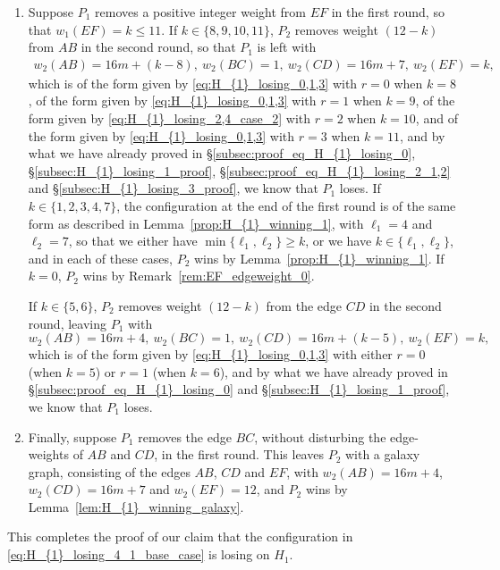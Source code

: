 \documentclass[11pt,reqno]{amsart}
\theoremstyle{definition}
\theoremstyle{definition}
\begin{document}
\begin{enumerate}
\item Suppose $P_{1}$ removes a positive integer weight from $EF$ in the first round, so that $w_{1}(EF)=k\leqslant 11$. If $k \in \{8,9,10,11\}$, $P_{2}$ removes weight $(12-k)$ from $AB$ in the second round, so that $P_{1}$ is left with
\begin{align}
w_{2}(AB)=16m+(k-8),\ w_{2}(BC)=1,\ w_{2}(CD)=16m+7,\ w_{2}(EF)=k,\nonumber
\end{align}
which is of the form given by \eqref{eq:H_{1}_losing_0,1,3} with $r=0$ when $k=8$, of the form given by \eqref{eq:H_{1}_losing_0,1,3} with $r=1$ when $k=9$, of the form given by \eqref{eq:H_{1}_losing_2,4_case_2} with $r=2$ when $k=10$, and of the form given by \eqref{eq:H_{1}_losing_0,1,3} with $r=3$ when $k=11$, and by what we have already proved in \S\ref{subsec:proof_eq_H_{1}_losing_0}, \S\ref{subsec:H_{1}_losing_1_proof}, \S\ref{subsec:proof_eq_H_{1}_losing_2_1,2} and \S\ref{subsec:H_{1}_losing_3_proof}, we know that $P_{1}$ loses. If $k \in \{1,2,3,4,7\}$, the configuration at the end of the first round is of the same form as described in Lemma~\ref{prop:H_{1}_winning_1}, with $\ell_{1}=4$ and $\ell_{2}=7$, so that we either have $\min\{\ell_{1},\ell_{2}\}\geqslant k$, or we have $k \in \{\ell_{1},\ell_{2}\}$, and in each of these cases, $P_{2}$ wins by Lemma~\ref{prop:H_{1}_winning_1}. If $k=0$, $P_{2}$ wins by Remark~\ref{rem:EF_edgeweight_0}.

If $k \in \{5,6\}$, $P_{2}$ removes weight $(12-k)$ from the edge $CD$ in the second round, leaving $P_{1}$ with
\begin{equation}
w_{2}(AB)=16m+4,\ w_{2}(BC)=1,\ w_{2}(CD)=16m+(k-5),\ w_{2}(EF)=k,\nonumber
\end{equation}
which is of the form given by \eqref{eq:H_{1}_losing_0,1,3} with either $r=0$ (when $k=5$) or $r=1$ (when $k=6$), and by what we have already proved in \S\ref{subsec:proof_eq_H_{1}_losing_0} and \S\ref{subsec:H_{1}_losing_1_proof}, we know that $P_{1}$ loses.

\item Finally, suppose $P_{1}$ removes the edge $BC$, without disturbing the edge-weights of $AB$ and $CD$, in the first round. This leaves $P_{2}$ with a galaxy graph, consisting of the edges $AB$, $CD$ and $EF$, with $w_{2}(AB)=16m+4$, $w_{2}(CD)=16m+7$ and $w_{2}(EF)=12$, and $P_{2}$ wins by Lemma~\ref{lem:H_{1}_winning_galaxy}.
\end{enumerate}

This completes the proof of our claim that the configuration in \eqref{eq:H_{1}_losing_4_1_base_case} is losing on $H_{1}$.
\end{document}
